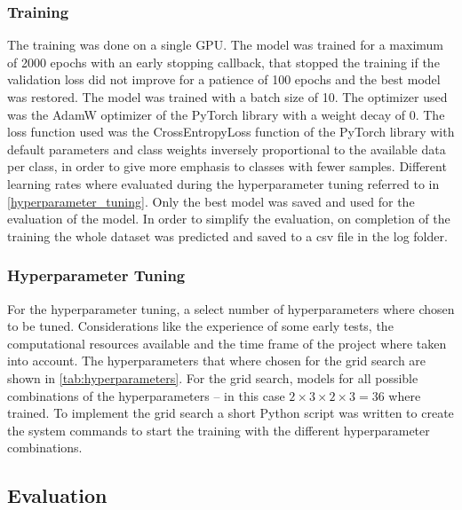 \subsubsection{Training}%

The training was done on a single GPU. The model was trained for a maximum of 2000 epochs
with an early stopping callback, that stopped the training if the validation loss did not improve
for a patience of 100 epochs and the best model was restored. The model was trained with a batch size of 10. The optimizer used was the AdamW
optimizer of the PyTorch library with a weight decay of 0. The loss function used was the
CrossEntropyLoss function of the PyTorch library with default parameters and class weights
inversely proportional to the available data per class, in order to give more emphasis to classes with fewer samples. 
Different learning rates where evaluated during the hyperparameter
tuning referred to in \autoref{hyperparameter_tuning}. Only the best model was saved and used for
the evaluation of the model. In order to simplify the evaluation, on completion of the training
the whole dataset was predicted and saved to a csv file in the log folder.

\subsubsection{Hyperparameter Tuning}%
\label{hyperparameter_tuning}

For the hyperparameter tuning, a select number of hyperparameters where chosen to be tuned.
Considerations like the experience of some early tests, the computational resources available
and the time frame of the project where taken into account. The hyperparameters that where
chosen for the grid search are shown in \autoref{tab:hyperparameters}. For the grid search,
models for all possible combinations of the hyperparameters -- in this case \( 2 \times 3 \times 2 \times 3 = 36 \) 
where trained. To implement the grid search a short Python
script was written to create the system commands to start the training with the different
hyperparameter combinations.



\subsection{Evaluation}%

